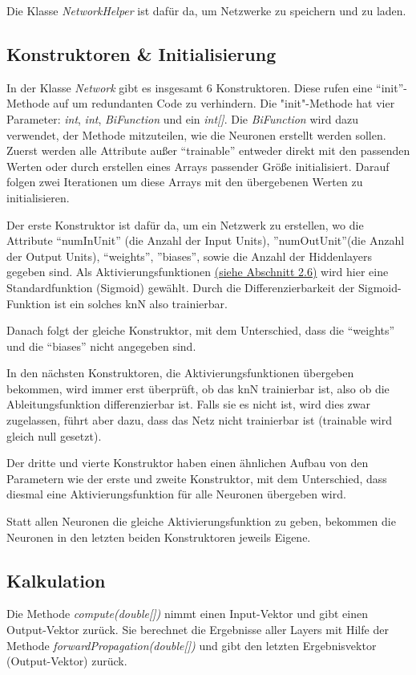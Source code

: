 \documentclass[paper=A4,pagesize=auto,12pt,headinclude=true,footinclude=true,BCOR=0mm,DIV=calc]{scrartcl}
\begin{document}
Die Klasse \textit{NetworkHelper} ist dafür da, um Netzwerke zu speichern und zu laden.


\subsection{Konstruktoren \& Initialisierung}
In der Klasse \textit{Network} gibt es insgesamt 6 Konstruktoren.
Diese rufen eine “init”-Methode auf um redundanten Code zu verhindern. Die "init"-Methode hat vier Parameter: \textit{int}, \textit{int}, \textit{BiFunction} und ein \textit{int[]}. Die \textit{BiFunction} wird dazu verwendet, der Methode mitzuteilen, wie die Neuronen erstellt werden sollen.
Zuerst werden alle Attribute außer “trainable” entweder direkt mit den passenden Werten oder durch erstellen eines Arrays passender Größe initialisiert.
Darauf folgen zwei Iterationen um diese Arrays mit den übergebenen Werten zu initialisieren.

Der erste Konstruktor ist dafür da, um ein Netzwerk zu erstellen, wo die Attribute “numInUnit” (die Anzahl der Input Units), ”numOutUnit”(die Anzahl der Output Units), “weights”, ”biases”, sowie die Anzahl der Hiddenlayers gegeben sind. Als Aktivierungsfunktionen \hyperlink{functioning}{(siehe Abschnitt 2.6)} wird hier eine Standardfunktion (Sigmoid) gewählt. Durch die Differenzierbarkeit der Sigmoid-Funktion ist ein solches knN also trainierbar.

Danach folgt der gleiche Konstruktor, mit dem Unterschied, dass die “weights” und die “biases” nicht angegeben sind.

In den nächsten Konstruktoren, die Aktivierungsfunktionen übergeben bekommen, wird immer erst überprüft, ob das knN trainierbar ist, also ob die Ableitungsfunktion differenzierbar ist. Falls sie es nicht ist, wird dies zwar zugelassen, führt aber dazu, dass das Netz nicht trainierbar ist (trainable wird gleich null gesetzt).

Der dritte und vierte Konstruktor haben einen ähnlichen Aufbau von den Parametern wie der erste und zweite Konstruktor, mit dem Unterschied, dass diesmal eine Aktivierungsfunktion für alle Neuronen übergeben wird.

Statt allen Neuronen die gleiche Aktivierungsfunktion zu geben, bekommen die Neuronen in den letzten beiden Konstruktoren jeweils Eigene.


\subsection{Kalkulation}
Die Methode \textit{compute(double[])} nimmt einen Input-Vektor und gibt einen Output-Vektor zurück. Sie berechnet die Ergebnisse aller Layers mit Hilfe der Methode \textit{forwardPropagation(double[])} und gibt den letzten Ergebnisvektor (Output-Vektor) zurück.
\end{document}

